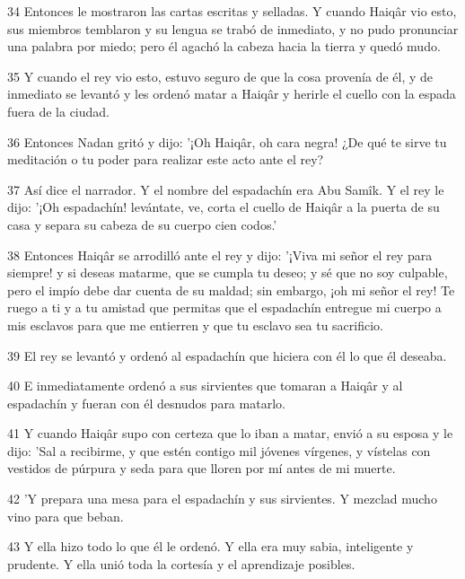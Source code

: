 \par 34 Entonces le mostraron las cartas escritas y selladas. Y cuando Haiqâr vio esto, sus miembros temblaron y su lengua se trabó de inmediato, y no pudo pronunciar una palabra por miedo; pero él agachó la cabeza hacia la tierra y quedó mudo.

\par 35 Y cuando el rey vio esto, estuvo seguro de que la cosa provenía de él, y de inmediato se levantó y les ordenó matar a Haiqâr y herirle el cuello con la espada fuera de la ciudad.

\par 36 Entonces Nadan gritó y dijo: '¡Oh Haiqâr, oh cara negra! ¿De qué te sirve tu meditación o tu poder para realizar este acto ante el rey?

\par 37 Así dice el narrador. Y el nombre del espadachín era Abu Samîk. Y el rey le dijo: '¡Oh espadachín! levántate, ve, corta el cuello de Haiqâr a la puerta de su casa y separa su cabeza de su cuerpo cien codos.'

\par 38 Entonces Haiqâr se arrodilló ante el rey y dijo: '¡Viva mi señor el rey para siempre! y si deseas matarme, que se cumpla tu deseo; y sé que no soy culpable, pero el impío debe dar cuenta de su maldad; sin embargo, ¡oh mi señor el rey! Te ruego a ti y a tu amistad que permitas que el espadachín entregue mi cuerpo a mis esclavos para que me entierren y que tu esclavo sea tu sacrificio.

\par 39 El rey se levantó y ordenó al espadachín que hiciera con él lo que él deseaba.

\par 40 E inmediatamente ordenó a sus sirvientes que tomaran a Haiqâr y al espadachín y fueran con él desnudos para matarlo.

\par 41 Y cuando Haiqâr supo con certeza que lo iban a matar, envió a su esposa y le dijo: 'Sal a recibirme, y que estén contigo mil jóvenes vírgenes, y vístelas con vestidos de púrpura y seda para que lloren por mí antes de mi muerte.

\par 42 'Y prepara una mesa para el espadachín y sus sirvientes. Y mezclad mucho vino para que beban.

\par 43 Y ella hizo todo lo que él le ordenó. Y ella era muy sabia, inteligente y prudente. Y ella unió toda la cortesía y el aprendizaje posibles.

